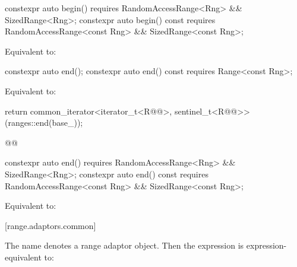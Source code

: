 %
\begin{itemdecl}
constexpr auto begin()
  requires RandomAccessRange<Rng> && SizedRange<Rng>;
constexpr auto begin() const
  requires RandomAccessRange<const Rng> && SizedRange<const Rng>;
\end{itemdecl}

\begin{itemdescr}
\pnum
\effects Equivalent to: 
\end{itemdescr}

%
\begin{itemdecl}
constexpr auto end();
constexpr auto end() const requires Range<const Rng>;
\end{itemdecl}

\begin{itemdescr}
\pnum
{}

\pnum
\effects Equivalent to:
\begin{codeblock}
return common_iterator<iterator_t<R@@>, sentinel_t<R@@>>(ranges::end(base_));
\end{codeblock}
\begin{codeblock}
@@
\end{codeblock}
\end{itemdescr}

%
\begin{itemdecl}
constexpr auto end()
  requires RandomAccessRange<Rng> && SizedRange<Rng>;
constexpr auto end() const
  requires RandomAccessRange<const Rng> && SizedRange<const Rng>;
\end{itemdecl}

\begin{itemdescr}
\pnum
\effects Equivalent to: 
\end{itemdescr}

[range.adaptors.common]{}

\pnum
The name  denotes a range adaptor
object.  Then the expression
 is expression-equivalent to:

